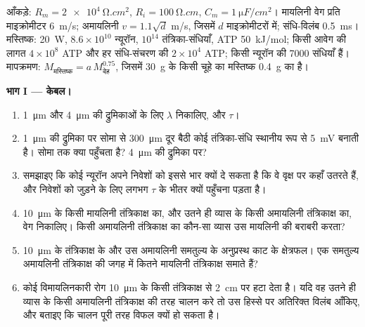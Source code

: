 \begin{problem}
\label{pb:b3:nervous-systems:1}
आँकड़े: $R_{m} = \qty{2e4}{\ohm.cm^2}$, $R_{i} = \qty{100}{\ohm.cm}$,
$C_{m} = \qty{1}{\micro F/cm^2}$। मायलिनी वेग प्रति माइक्रोमीटर
\qty{6}{m/s}; अमायलिनी $v = 1.1\sqrt{d}$ m/s, जिसमें $d$
माइक्रोमीटरों में; संधि-विलंब \qty{0.5}{ms}। मस्तिष्क: \qty{20}{W},
$8.6\times 10^{10}$ न्यूरॉन, $10^{14}$ तंत्रिका-संधियाँ, ATP \qty{50}{kJ/mol};
किसी आवेग की लागत $4\times 10^{8}$ ATP और हर संधि-संचरण की
$2\times 10^{4}$ ATP; किसी न्यूरॉन की \num{7000} संधियाँ हैं। मापक्रमण:
$M_{\text{मस्तिष्क}} = a\,M_{\text{देह}}^{0.75}$, जिसमें \qty{30}{g} के
किसी चूहे का मस्तिष्क \qty{0.4}{g} का है।

\medskip
\noindent\textbf{भाग I --- केबल।}
\begin{enumerate}
  \item \qty{1}{\micro m} और \qty{4}{\micro m} की द्रुमिकाओं के लिए
        $\lambda$ निकालिए, और $\tau$।
  \item \qty{1}{\micro m} की द्रुमिका पर सोमा से \qty{300}{\micro m}
        दूर बैठी कोई तंत्रिका-संधि स्थानीय रूप से \qty{5}{mV} बनाती
        है। सोमा तक क्या पहुँचता है? \qty{4}{\micro m} की द्रुमिका पर?
  \item समझाइए कि कोई न्यूरॉन अपने निवेशों को इससे भार क्यों दे सकता है
        कि वे वृक्ष पर कहाँ उतरते हैं, और निवेशों को जुड़ने के लिए
        लगभग $\tau$ के भीतर क्यों पहुँचना पड़ता है।
  \item \qty{10}{\micro m} के किसी मायलिनी तंत्रिकाक्ष का, और उतने ही
        व्यास के किसी अमायलिनी तंत्रिकाक्ष का, वेग निकालिए। किसी
        अमायलिनी तंत्रिकाक्ष का कौन-सा व्यास उस मायलिनी की बराबरी
        करता?
  \item \qty{10}{\micro m} के तंत्रिकाक्ष के और उस अमायलिनी समतुल्य के
        अनुप्रस्थ काट के क्षेत्रफल। एक समतुल्य अमायलिनी तंत्रिकाक्ष की
        जगह में कितने मायलिनी तंत्रिकाक्ष समाते हैं?
  \item कोई विमायलिनकारी रोग \qty{10}{\micro m} के किसी तंत्रिकाक्ष से
        \qty{2}{cm} पर  हटा देता है। यदि वह उतने ही व्यास के
        किसी अमायलिनी तंत्रिकाक्ष की तरह चालन करे तो उस हिस्से पर
        अतिरिक्त विलंब आँकिए, और बताइए कि चालन पूरी तरह विफल क्यों हो
        सकता है।
\end{enumerate}


\end{problem}
